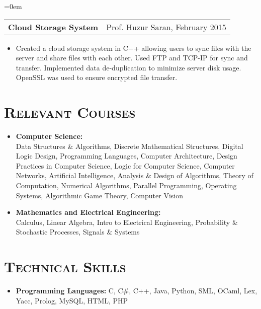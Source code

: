\documentclass{article}
\makeatletter
\newenvironment{longversion}{}{} %
\newcommand{\headerrow}[2]
{\begin{tabular*}{\linewidth}{l@{\extracolsep{\fill}}r}
	#1 &
	#2 \\
\end{tabular*}}
\newcommand{\tmpsection}[1]{}
\let\tmpsection=\section
\renewcommand{\section}[1]{\tmpsection*{\textsc{#1}}}
\makeatother
\begin{document}
\begin{longversion}
\begin{list} {}{\leftmargin=0em}
\item[]
  \headerrow{ \textbf{Cloud Storage System}} {Prof. Huzur Saran, February 2015}
  \begin{itemize} \item[]
  Created a cloud storage system in C++ allowing users to sync files with the server and share files with each other. Used FTP and TCP-IP for sync and transfer. Implemented data de-duplication to minimize server disk usage. OpenSSL was used to ensure encrypted file transfer.
  \end{itemize}

\end{list}
\end{longversion}

\begin{longversion}
\section{Relevant Courses}
\begin{itemize}
  \setlength\itemsep{-1em}
    \item \textbf{Computer Science:} \\
      Data Structures \& Algorithms, Discrete Mathematical Structures, Digital Logic Design, Programming Languages, Computer Architecture, Design Practices in Computer Science, Logic for Computer Science, Computer Networks, Artificial Intelligence, Analysis \& Design of Algorithms, Theory of Computation, Numerical Algorithms, Parallel Programming, Operating Systems, Algorithmic Game Theory, Computer Vision  \\

    \item \textbf{Mathematics and Electrical Engineering:} \\
      Calculus, Linear Algebra, Intro to Electrical Engineering, Probability \& Stochastic Processes, Signals \& Systems
\end{itemize}
\end{longversion}

\begin{longversion}
\section{Technical Skills}
\begin{itemize}
    \item \textbf{Programming Languages:} C, C\#, C++, Java, Python, SML, OCaml, Lex, Yacc, Prolog, MySQL, HTML, PHP
\end{itemize}
\end{longversion}
\end{document}
